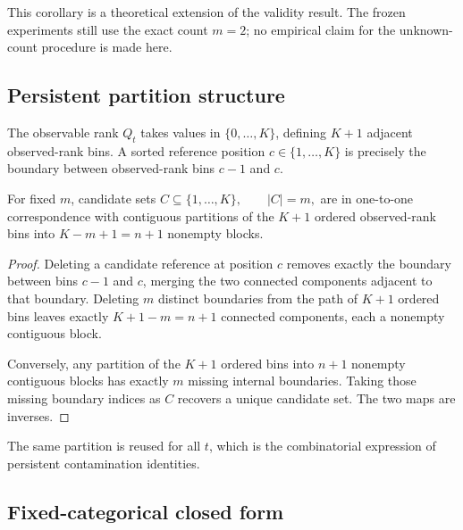 This corollary is a theoretical extension of the validity result. The frozen experiments still use the exact count \(m=2\); no empirical claim for the unknown-count procedure is made here.

\subsection{Persistent partition structure}

The observable rank \(Q_t\) takes values in \(\{0,\ldots,K\}\), defining \(K+1\) adjacent observed-rank bins. A sorted reference position \(c\in\{1,\ldots,K\}\) is precisely the boundary between observed-rank bins \(c-1\) and \(c\).

\begin{proposition}
For fixed \(m\), candidate sets
\(C\subseteq\{1,\ldots,K\}, \qquad |C|=m,\)
are in one-to-one correspondence with contiguous partitions of the \(K+1\) ordered observed-rank bins into
\(K-m+1=n+1\)
nonempty blocks.
\end{proposition}

\begin{proof}
Deleting a candidate reference at position \(c\) removes exactly the boundary between bins \(c-1\) and \(c\), merging the two connected components adjacent to that boundary. Deleting \(m\) distinct boundaries from the path of \(K+1\) ordered bins leaves exactly \(K+1-m=n+1\) connected components, each a nonempty contiguous block.

Conversely, any partition of the \(K+1\) ordered bins into \(n+1\) nonempty contiguous blocks has exactly \(m\) missing internal boundaries. Taking those missing boundary indices as \(C\) recovers a unique candidate set. The two maps are inverses.
\end{proof}

The same partition is reused for all \(t\), which is the combinatorial expression of persistent contamination identities.

\subsection{Fixed-categorical closed form}

